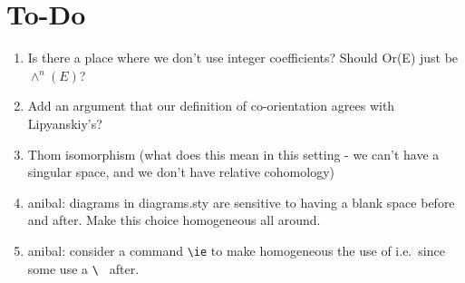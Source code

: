 
\section*{To-Do}
\begin{enumerate}
	\item Is there a place where we don't use integer coefficients?  Should Or(E) just be $\wedge^n(E)$?

	\item Add an argument that our definition of co-orientation agrees with Lipyanskiy's?

	\item Thom isomorphism (what does this mean in this setting - we can't have a singular space, and we don't have relative cohomology)




	\item anibal: diagrams in diagrams.sty are sensitive to having a blank space before and after.
	Make this choice homogeneous all around.

	\item anibal: consider a command \verb|\ie| to make homogeneous the use of i.e.\ since some use a \verb|\ | after.


\begin{comment}
	\item \sout{Picture for creasing.}
	\item Compactness and orientation assumptions on Theorem 3.13 (transversality constrains preserve q-iso type).

	\item \sout{Treatment of creasing.}
	\item Guillemin-Pollock for mnfds with corner.

	\item Clarify isomorphisms used in orientations and make more explicit how the Lipyanskiy orientations fit.


	\item More on Mayer-Vietoris - check full argument
	\item Poincar\'e Lemma - check new proof
	\item (Anibal) Add a better treatment of ``cst" from \verb|Flows/old/pd_cubical_S2.Feb16.tex| \\
	Greg: Let K be any finite set of cubical faces and let L be a single cubical face. We need $cst(K)\cup cst(L)$ to be $cst(K\cup L)$  (maybe this part is just by definition?) and we need $cst(K)\cap cst(L)$ to be $cst(K ? L)$   where $K ? L$ needs to be some set of faces with cardinality less than or equal to that of K.
\end{comment}


\end{enumerate}
